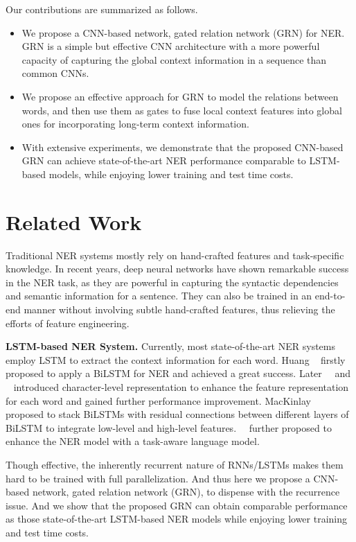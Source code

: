 \documentclass[letterpaper]{article} \usepackage{aaai19}  \usepackage{times}  \usepackage{helvet}  \usepackage{courier}  \usepackage{url}  \usepackage{graphicx}  \usepackage{amsmath}
\newcommand{\etal}{\text{et al.}}
\newcommand{\ie}{\text{i.e.,}}
\newcommand{\GRN}{GRN}
\begin{document}
Our contributions are summarized as follows.
\begin{itemize}
\item We propose a CNN-based network, \ie{} gated relation network (\GRN{}) for NER. \GRN{} is a simple but effective CNN architecture with a more powerful capacity of capturing the global context information in a sequence than common CNNs.
\item We propose an effective approach for \GRN{} to model the relations between words, and then use them as gates to fuse local context features into global ones for incorporating long-term context information.
\item With extensive experiments, we demonstrate that the proposed CNN-based \GRN{} can achieve state-of-the-art NER performance comparable to LSTM-based models, while enjoying lower training and test time costs.

\end{itemize}

\section{Related Work}
Traditional NER systems mostly rely on hand-crafted features and task-specific knowledge. In recent years, deep neural networks have shown remarkable success in the NER task, as they are powerful in capturing the syntactic dependencies and semantic information for a sentence. They can also be trained in an end-to-end manner without involving subtle hand-crafted features, thus relieving the efforts of feature engineering.

\textbf{LSTM-based NER System.} Currently, most state-of-the-art NER systems employ LSTM to extract the context information for each word. Huang \etal~ firstly proposed to apply a BiLSTM for NER and achieved a great success. Later~\citeauthor{ma2016CNNBLSTMCRF}~ and \citeauthor{chiu2016named}~ introduced character-level representation to enhance the feature representation for each word and gained further performance improvement. MacKinlay \etal~ proposed to stack BiLSTMs with residual connections between different layers of BiLSTM to integrate low-level and high-level features.~\citeauthor{Liu2018Empower}~ further proposed to enhance the NER model with a task-aware language model.

Though effective, the inherently recurrent nature of RNNs/LSTMs makes them hard to be trained with full parallelization. And thus here we propose a CNN-based network, \ie{} gated relation network (\GRN{}), to dispense with the recurrence issue. And we show that the proposed \GRN{} can obtain comparable performance as those state-of-the-art LSTM-based NER models while enjoying lower training and test time costs.
\end{document}

